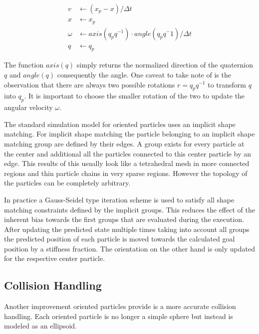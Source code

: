 \begin{align}
v &\leftarrow (x_p - x)/\Delta t \\
x &\leftarrow x_p \\
\omega &\leftarrow axis(q_p q^{-1}) \cdot angle(q_p q^-1)/\Delta t \\
q &\leftarrow q_p
\end{align}

The function $axis(q)$ simply returns the normalized direction of the quaternion $q$ and $angle(q)$ consequently the angle. One caveat to take note of is the observation that there are always two possible rotations $r=q_pq^{-1}$ to transform $q$ into $q_p$. It is important to choose the smaller rotation of the two to update the angular velocity $\omega$.

The standard simulation model for oriented particles uses an implicit shape matching. For implicit shape matching the particle belonging to an implicit shape matching group are defined by their edges. A group exists for every particle at the center and additional all the particles connected to this center particle by an edge. This results of this usually look like a tetrahedral mesh in more connected regions and thin particle chains in very sparse regions. However the topology of the particles can be completely arbitrary.

In practice a Gauss-Seidel type iteration scheme is used to satisfy all shape matching constraints defined by the implicit groups. This reduces the effect of the inherent bias towards the first groups that are evaluated during the execution. After updating the predicted state multiple times taking into account all groups the predicted position of each particle is moved towards the calculated goal position by a stiffness fraction. The orientation on the other hand is only updated for the respective center particle.

\subsection{Collision Handling}
\label{subsec:collision_handling}

Another improvement oriented particles provide is a more accurate collision handling. Each oriented particle is no longer a simple sphere but instead is modeled as an ellipsoid.

\begin{figure}[htb]
	\centering
	\label{fig:collision_handling}
\end{figure}

